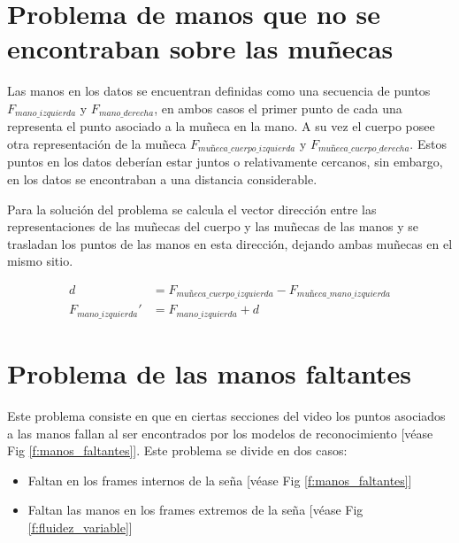 \section{Problema de manos que no se encontraban sobre las muñecas}

Las manos en los datos se encuentran definidas como una secuencia de puntos $F_{mano\_izquierda}$ y 
$F_{mano\_derecha}$, en ambos casos el primer punto de cada una representa el punto asociado a la muñeca 
en la mano. A su vez el cuerpo posee otra representación de la muñeca $F_{muñeca\_cuerpo\_izquierda}$ y $F_{muñeca\_cuerpo\_derecha}$. 
Estos puntos en los datos deberían
estar juntos o relativamente cercanos, sin embargo, en los datos se encontraban a una distancia considerable.

Para la solución del problema se calcula el vector dirección entre las representaciones de las muñecas del cuerpo 
y las muñecas de las manos y se trasladan los puntos de las manos en esta dirección, dejando ambas muñecas en el 
mismo sitio.

\begin{align}
d &= F_{muñeca\_cuerpo\_izquierda} - F_{muñeca\_mano\_izquierda} \\
F_{mano\_izquierda}' &= F_{mano\_izquierda} + d
\end{align}

\section{Problema de las manos faltantes}

Este problema consiste en que en ciertas secciones del video los puntos asociados a las manos fallan al ser 
encontrados por los modelos de reconocimiento [véase Fig \ref{f:manos_faltantes}]. Este problema se divide en dos casos:

\begin{itemize}
\item Faltan en los frames internos de la seña [véase Fig \ref{f:manos_faltantes}]
\item Faltan las manos en los frames extremos de la seña [véase Fig \ref{f:fluidez_variable}]
\end{itemize}

